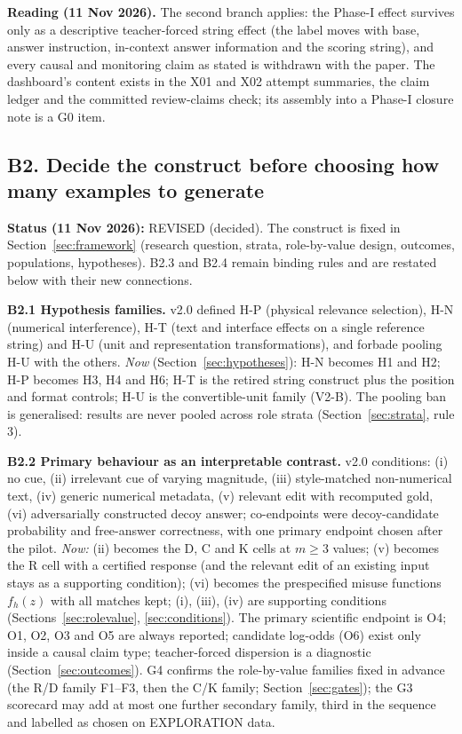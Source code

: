 \documentclass[10pt,a4paper]{article}
\begin{document}
\textbf{Reading (11 Nov 2026).} The second branch applies: the Phase-I effect survives only as a descriptive
teacher-forced string effect (the label moves with base, answer instruction, in-context answer information and the
scoring string), and every causal and monitoring claim as stated is withdrawn with the paper. The dashboard's
content exists in the X01 and X02 attempt summaries, the claim ledger and the committed review-claims check; its
assembly into a Phase-I closure note is a G0 item.

\subsection{B2. Decide the construct before choosing how many examples to generate}\label{sec:phaseB-B2}

\textbf{Status (11 Nov 2026):} REVISED (decided). The construct is fixed in Section~\ref{sec:framework}
(research question, strata, role-by-value design, outcomes, populations, hypotheses). B2.3 and B2.4 remain
binding rules and are restated below with their new connections.

\textbf{B2.1 Hypothesis families.} v2.0 defined H-P (physical relevance selection), H-N (numerical
interference), H-T (text and interface effects on a single reference string) and H-U (unit and representation
transformations), and forbade pooling H-U with the others. \emph{Now} (Section~\ref{sec:hypotheses}): H-N
becomes H1 and H2; H-P becomes H3, H4 and H6; H-T is the retired string construct plus the position and format
controls; H-U is the convertible-unit family (V2-B). The pooling ban is generalised: results are never pooled
across role strata (Section~\ref{sec:strata}, rule 3).

\textbf{B2.2 Primary behaviour as an interpretable contrast.} v2.0 conditions: (i) no cue, (ii) irrelevant cue of
varying magnitude, (iii) style-matched non-numerical text, (iv) generic numerical metadata, (v) relevant edit with
recomputed gold, (vi) adversarially constructed decoy answer; co-endpoints were decoy-candidate probability and
free-answer correctness, with one primary endpoint chosen after the pilot. \emph{Now:} (ii) becomes the D, C and K
cells at $m\geq3$ values; (v) becomes the R cell with a certified response (and the relevant edit of an existing
input stays as a supporting condition); (vi) becomes the prespecified misuse functions $f_h(z)$ with all matches
kept; (i), (iii), (iv) are supporting conditions (Sections~\ref{sec:rolevalue}, \ref{sec:conditions}). The
primary scientific endpoint is O4; O1, O2, O3 and O5 are always reported; candidate log-odds (O6) exist only
inside a causal claim type; teacher-forced dispersion is a diagnostic (Section~\ref{sec:outcomes}). G4 confirms
the role-by-value families fixed in advance (the R/D family F1--F3, then the C/K family; Section~\ref{sec:gates}); the G3
scorecard may add at most one further secondary family, third in the sequence and labelled as chosen on EXPLORATION data.
\end{document}
